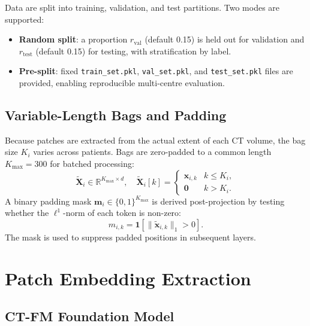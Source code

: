 \documentclass[11pt,a4paper]{article}
\begin{document}
Data are split into training, validation, and test partitions. Two modes are
supported:
\begin{itemize}
  \item \textbf{Random split}: a proportion $r_{\text{val}}$ (default 0.15) is held out
        for validation and $r_{\text{test}}$ (default 0.15) for testing, with
        stratification by label.
  \item \textbf{Pre-split}: fixed \texttt{train\_set.pkl}, \texttt{val\_set.pkl},
        and \texttt{test\_set.pkl} files are provided, enabling reproducible
        multi-centre evaluation.
\end{itemize}

\subsection{Variable-Length Bags and Padding}

Because patches are extracted from the actual extent of each CT volume, the bag
size $K_i$ varies across patients. Bags are zero-padded to a common length
$K_{\max} = 300$ for batched processing:
\begin{equation}
  \tilde{\mathbf{X}}_i \in \mathbb{R}^{K_{\max} \times d},
  \quad
  \tilde{\mathbf{X}}_i[k] =
  \begin{cases}
    \mathbf{x}_{i,k} & k \leq K_i, \\
    \mathbf{0}        & k > K_i.
  \end{cases}
\end{equation}
A binary padding mask $\mathbf{m}_i \in \{0,1\}^{K_{\max}}$ is derived
post-projection by testing whether the $\ell^1$-norm of each token is non-zero:
\begin{equation}
  m_{i,k} = \mathbf{1}\!\left[\|\tilde{\mathbf{x}}_{i,k}\|_1 > 0\right].
\end{equation}
The mask is used to suppress padded positions in subsequent layers.

\section{Patch Embedding Extraction}
\label{sec:embeddings}

\subsection{CT-FM Foundation Model}
\end{document}
